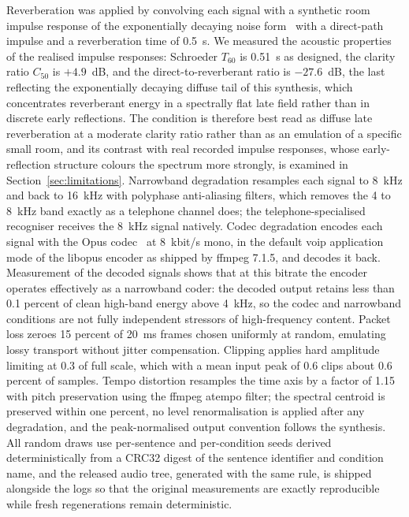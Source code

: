 Reverberation was applied by convolving each signal with a synthetic room
impulse response of the exponentially decaying noise
form~\cite{allen1979image,habets2006room} with a direct-path impulse and a
reverberation time of 0.5~s. We measured the acoustic properties of the
realised impulse responses: Schroeder $T_{60}$ is 0.51~s as designed, the
clarity ratio $C_{50}$ is $+4.9$~dB, and the direct-to-reverberant ratio is
$-27.6$~dB, the last reflecting the exponentially decaying diffuse tail of
this synthesis, which concentrates reverberant energy in a spectrally flat
late field rather than in discrete early reflections. The condition is
therefore best read as diffuse late reverberation at a moderate clarity
ratio rather than as an emulation of a specific small room, and its contrast
with real recorded impulse responses, whose early-reflection structure
colours the spectrum more strongly, is examined in
Section~\ref{sec:limitations}. Narrowband degradation resamples each
signal to 8~kHz and back to 16~kHz with polyphase anti-aliasing filters,
which removes the 4 to 8~kHz band exactly as a telephone channel does; the
telephone-specialised recogniser receives the 8~kHz signal natively. Codec
degradation encodes each signal with the Opus codec~\cite{valin2012definition}
at 8~kbit/s mono, in the default voip application mode of the libopus
encoder as shipped by ffmpeg 7.1.5, and decodes it back. Measurement of the
decoded signals shows that at this bitrate the encoder operates effectively
as a narrowband coder: the decoded output retains less than 0.1 percent of
clean high-band energy above 4~kHz, so the codec and narrowband conditions
are not fully independent stressors of high-frequency content. Packet loss
zeroes 15 percent of 20~ms frames chosen uniformly at random, emulating
lossy transport without jitter compensation. Clipping applies hard amplitude
limiting at 0.3 of full scale, which with a mean input peak of 0.6 clips
about 0.6 percent of samples. Tempo distortion resamples the time axis by a
factor of 1.15 with pitch preservation using the ffmpeg atempo filter; the
spectral centroid is preserved within one percent, no level renormalisation
is applied after any degradation, and the peak-normalised output convention
follows the synthesis. All random draws use per-sentence and per-condition
seeds derived deterministically from a CRC32 digest of the sentence
identifier and condition name, and the released audio tree, generated with
the same rule, is shipped alongside the logs so that the original
measurements are exactly reproducible while fresh regenerations remain
deterministic.

